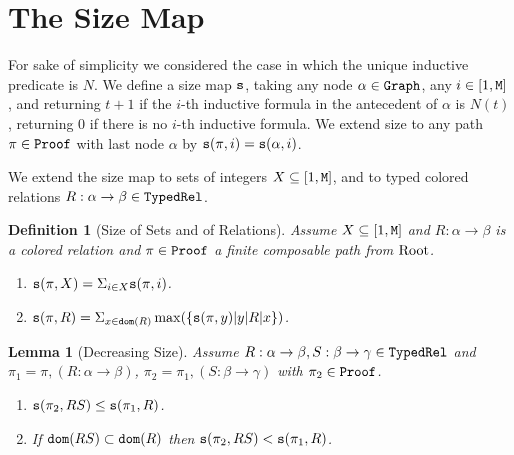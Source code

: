 \documentclass{lmcs}
\newtheorem{lemma}[theorem]{Lemma}
\newtheorem{definition}[theorem]{Definition}
\begin{document}



\section{The Size Map}  

For sake of simplicity we considered the case in which the unique inductive predicate is $N$. 
We define a size map ${\tt s}$, taking any node $\alpha \in {\tt Graph}$, any $i \in [1,{\tt M}]$, 
and returning $t+1$ if the $i$-th inductive formula in the antecedent of $\alpha$ is $N(t)$,
returning $0$ if there is no $i$-th inductive formula.  We extend size to any path 
$\pi \in {\tt Proof}$ with last node $\alpha$ by ${\tt s}(\pi,i) = {\tt s}(\alpha,i)$. 


We extend the size map to sets of integers $X \subseteq [1,{\tt M}]$,
and to typed colored relations $R:\alpha \rightarrow \beta \in {\tt TypedRel}$.
 



\begin{definition}[Size of Sets and of Relations]
Assume $X \subseteq [1,{\tt M}]$ and $R:\alpha \rightarrow \beta$  is a colored
relation and $\pi \in {\tt Proof}$ a finite composable path from ${\rm Root}$.
\begin{enumerate} 
\item
${\tt s}(\pi, X) = \Sigma_{i \in X} {\tt s}(\pi,i)$.

\item
${\tt s}(\pi, R) = \Sigma_{x \in {\tt dom}(R)} \max( \{ {\tt s}(\pi,y) | y {| R |} x \} )$.
\end{enumerate}
\end{definition}

\begin{lemma}[Decreasing Size]
\label{lemma-decreasing-size}
Assume $R:\alpha \rightarrow \beta, S:\beta \rightarrow \gamma \in {\tt TypedRel}$
and $\pi_1 = \pi, (R:\alpha \rightarrow \beta)$, $\pi_2 = \pi_1, (S:\beta \rightarrow \gamma)$
with $\pi_2 \in {\tt Proof}$.
\begin{enumerate}
\item
\label{lemma-decreasing-size-01}
${\tt s}(\pi_2, RS) \le {\tt s}(\pi_1, R)$.
\item
\label{lemma-decreasing-size-02}
If ${\tt dom}(RS) \subset {\tt dom}(R)$ then
${\tt s}(\pi_2, RS) < {\tt s}(\pi_1, R)$.
\end{enumerate}
\end{lemma}
\end{document}

